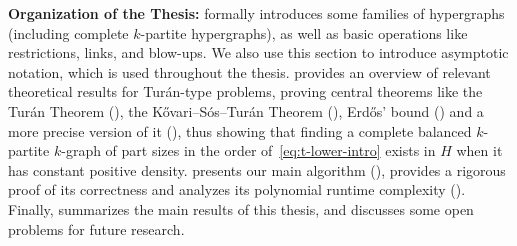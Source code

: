 \textbf{Organization of the Thesis:}
 formally introduces some families of hypergraphs
(including complete $k$-partite hypergraphs),
as well as basic operations like restrictions, links, and blow-ups.
We also use this section to introduce asymptotic notation, which is used throughout the thesis.
 provides an overview of relevant theoretical results for Turán-type problems,
proving central theorems like the Turán Theorem (), the Kővari--Sós--Turán Theorem (),
Erdős' bound () and a more precise version of it (),
thus showing that finding a complete balanced $k$-partite $k$-graph of part sizes in the order of~\eqref{eq:t-lower-intro}
exists in $H$ when it has constant positive density.
 presents our main algorithm (),
provides a rigorous proof of its correctness and analyzes its polynomial runtime complexity ().
Finally,  summarizes the main results of this thesis, and discusses some open problems for future research.
